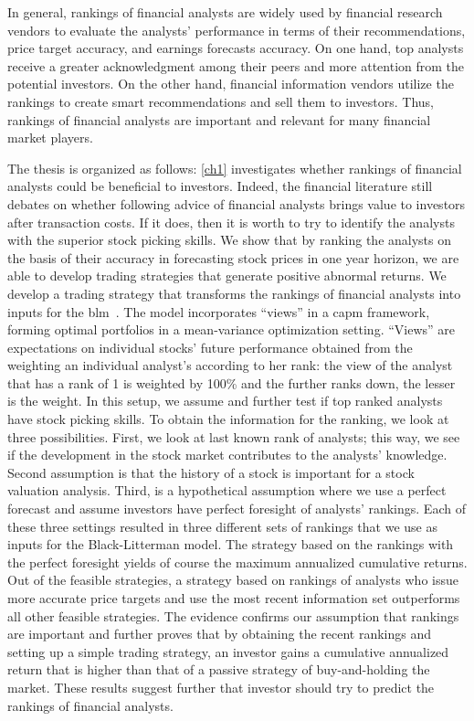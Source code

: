 In general, rankings of financial analysts are widely used by  financial research vendors to evaluate the analysts' performance in terms of their recommendations, price target accuracy, and earnings forecasts accuracy. On one hand, top analysts receive a greater acknowledgment among their peers and more attention from the potential investors. On the other hand, financial information vendors utilize the rankings to create smart recommendations  and sell them to investors. Thus, rankings of financial analysts are important and relevant for many financial market players. 
 

 
The thesis is organized as follows: \ref{ch1} investigates whether rankings of financial analysts could be  beneficial to investors. Indeed, the financial literature still debates on whether following advice of financial analysts brings value to investors after transaction costs. If it does, then it is worth to try  to identify the analysts with the superior stock picking skills. We show that by ranking the analysts on the basis of their accuracy in forecasting  stock prices in one year horizon, we are able to develop trading strategies that generate  positive abnormal returns.  We develop a trading strategy that transforms the rankings of financial analysts into inputs for the \gls{blm}~\cite{black1992}. The model incorporates ``views'' in a \gls{capm} framework, forming optimal portfolios in a mean-variance optimization setting. ``Views'' are expectations on individual stocks’ future performance obtained from the weighting an individual analyst’s according to her rank: the view of the analyst that has a rank of 1 is weighted by 100\% and the further ranks down, the lesser is the weight. In this setup, we assume and further test if top ranked analysts have stock picking skills. To obtain the information for the ranking, we look at three possibilities. First, we look at last known rank of analysts; this way, we see if the \naive{} development in the stock market contributes to the analysts’ knowledge. Second assumption is that the  history of a stock is important for a stock valuation analysis. Third, is a hypothetical assumption where we use a perfect forecast and assume investors have perfect foresight of analysts' rankings. Each of these three settings resulted in three different sets of rankings that we use as inputs for the Black-Litterman model. The strategy based on the rankings with the perfect foresight yields of course the maximum annualized cumulative returns. Out of the feasible strategies, a strategy based on rankings of analysts who issue more accurate price targets and use the most recent information set outperforms all other feasible strategies. The evidence confirms our assumption that rankings are important and further proves that by obtaining the recent rankings and setting up a simple trading strategy, an investor gains a cumulative annualized return that is higher than that of a passive strategy of buy-and-holding the market. These results suggest further that investor should try to predict the rankings of financial analysts.

